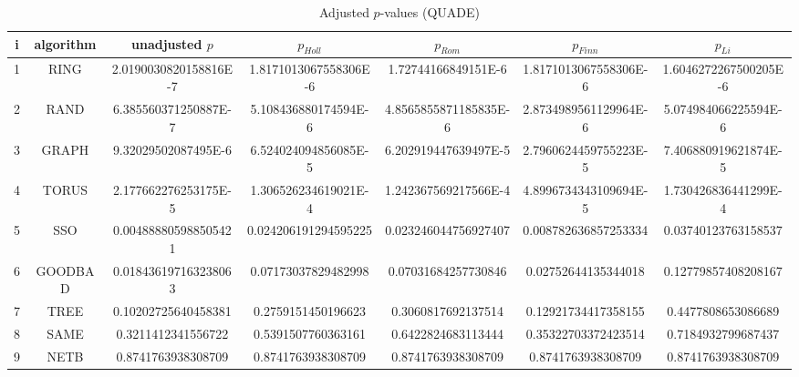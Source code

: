 \documentclass[a4paper,10pt]{article}
\begin{document}
\begin{landscape}
\begin{table}[!htp]
\centering\scriptsize
\caption{Adjusted $p$-values (QUADE)}
\begin{tabular}{ccccccc}
i&algorithm&unadjusted $p$&$p_{Holl}$&$p_{Rom}$&$p_{Finn}$&$p_{Li}$\\
\hline
1& RING&2.0190030820158816E-7&1.8171013067558306E-6&1.72744166849151E-6&1.8171013067558306E-6&1.6046272267500205E-6\\
2& RAND&6.385560371250887E-7&5.108436880174594E-6&4.8565855871185835E-6&2.8734989561129964E-6&5.074984066225594E-6\\
3& GRAPH&9.32029502087495E-6&6.524024094856085E-5&6.202919447639497E-5&2.7960624459755223E-5&7.406880919621874E-5\\
4& TORUS&2.177662276253175E-5&1.306526234619021E-4&1.242367569217566E-4&4.8996734343109694E-5&1.730426836441299E-4\\
5& SSO&0.004888805988505421&0.024206191294595225&0.023246044756927407&0.008782636857253334&0.03740123763158537\\
6& GOODBAD&0.018436197163238063&0.07173037829482998&0.07031684257730846&0.02752644135344018&0.12779857408208167\\
7& TREE&0.10202725640458381&0.2759151450196623&0.3060817692137514&0.12921734417358155&0.4477808653086689\\
8& SAME&0.3211412341556722&0.5391507760363161&0.6422824683113444&0.35322703372423514&0.7184932799687437\\
9& NETB&0.8741763938308709&0.8741763938308709&0.8741763938308709&0.8741763938308709&0.8741763938308709\\
\hline
\end{tabular}
\end{table}

\end{landscape}
\end{document}
